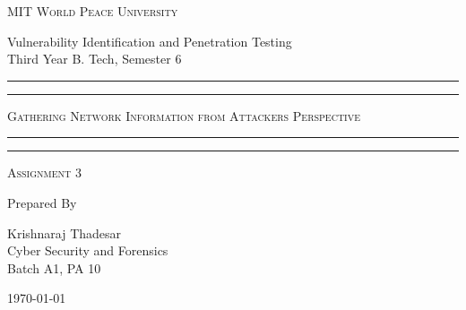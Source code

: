 \documentclass[11pt]{article}
\begin{document}
\begin{titlepage}
    \centering


    \huge\textsc{
        MIT World Peace University
    }\\

    \vspace{0.75\baselineskip} %

    \LARGE{
        Vulnerability Identification and Penetration Testing\\
        Third Year B. Tech, Semester 6
    }

    \vfill %


    \rule{\textwidth}{1.6pt}\vspace*{-\baselineskip}\vspace*{2pt}
    \rule{\textwidth}{0.6pt}
    \vspace{0.75\baselineskip} %



    \huge{\textsc{
            Gathering Network Information from Attackers Perspective
        }} \\



    \vspace{0.5\baselineskip} %
    \rule{\textwidth}{0.6pt}\vspace*{-\baselineskip}\vspace*{2.8pt}
    \rule{\textwidth}{1.6pt}

    \vspace{1\baselineskip} %


    \LARGE\textsc{
        Assignment 3
    } %
    \vfill


    Prepared By
    \vspace{0.5\baselineskip} %

    \Large{
        Krishnaraj Thadesar \\
        Cyber Security and Forensics\\
        Batch A1, PA 10
    }


    \vspace{0.5\baselineskip} %
    \today

\end{titlepage}
\end{document}
